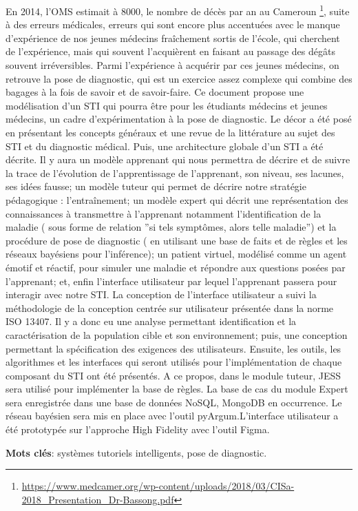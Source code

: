 
En 2014, l’OMS estimait à 8000, le nombre de décès par an au Cameroun \footnote{\href{https://www.medcamer.org/wp-content/uploads/2018/03/CISa-2018_Presentation_Dr-Bassong.pdf}{https://www.medcamer.org/wp-content/uploads/2018/03/CISa-2018_Presentation_Dr-Bassong.pdf}}, suite à des erreurs médicales, erreurs qui sont encore plus accentuées avec le manque d'expérience de nos jeunes médecins fraîchement sortis de l'école, qui cherchent de l'expérience, mais qui souvent l'acquièrent en faisant au passage des dégâts souvent irréversibles. Parmi l'expérience à acquérir par ces jeunes médecins, on retrouve la pose de diagnostic, qui est un exercice assez complexe qui combine des bagages à la fois de savoir et de savoir-faire. Ce document propose une modélisation d’un STI qui pourra être pour les étudiants médecins et jeunes médecins, un cadre d’expérimentation à la pose de diagnostic. Le décor a été posé en présentant les concepts généraux et une revue de la littérature au sujet des STI et du diagnostic médical. Puis, une architecture globale d'un STI a été décrite. Il y aura un modèle apprenant qui nous permettra de décrire et de suivre la trace de l’évolution de l’apprentissage de l’apprenant, son niveau, ses lacunes, ses idées fausse; un modèle tuteur qui permet de décrire notre stratégie pédagogique : l’entraînement; un modèle expert qui décrit une représentation des connaissances à transmettre à l’apprenant notamment l’identification de la maladie ( sous forme de relation ”si tels symptômes, alors telle maladie”) et la procédure de pose de diagnostic ( en utilisant une base de faits et de règles et les réseaux bayésiens pour l’inférence); un patient virtuel, modélisé comme un agent émotif et réactif, pour simuler une maladie et répondre aux questions posées par l’apprenant; et, enfin l’interface utilisateur par lequel l’apprenant passera pour interagir avec notre STI. La conception de l’interface utilisateur a suivi la méthodologie de la conception centrée sur utilisateur présentée dans la norme ISO 13407. Il y a donc eu une analyse permettant identification et la caractérisation de la population cible et son environnement; puis, une conception permettant la spécification des exigences des utilisateurs. Ensuite, les outils, les algorithmes et les interfaces qui seront utilisés pour l'implémentation de chaque composant du STI ont été présentés. A ce propos, dans le module tuteur, JESS sera utilisé pour implémenter la base de règles. La base de cas du module Expert sera enregistrée dans une base de données NoSQL, MongoDB en occurrence. Le réseau bayésien sera mis en place avec l’outil pyArgum.L’interface utilisateur a été prototypée sur l’approche High Fidelity avec l’outil Figma.

\textbf{Mots clés}: systèmes tutoriels intelligents, pose de diagnostic.